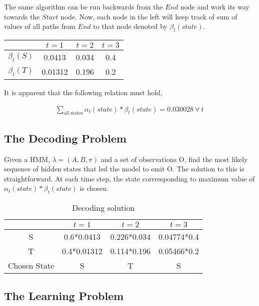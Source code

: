 \documentclass[11pt, a4paper]{article}
\begin{document}
The same algorithm can be run backwards from the $End$ node and work its way towards the $Start$ node. Now, each node in the left will keep track of sum of values of all paths from $End$ to that node denoted by $\beta_t(state)$.

\begin{table}[h!]
	\centering
	\begin{tabular}{c|c|c|c}
		\toprule
		             & $t=1$   & $t=2$ & $t=3$ \\
		\midrule
		$\beta_t(S)$ & 0.0413  & 0.034 & 0.4   \\
		$\beta_t(T)$ & 0.01312 & 0.196 & 0.2   \\
		\bottomrule
	\end{tabular}
\end{table}

It is apparent that the following relation must hold,

\begin{align*}
	\sum_{\text{all states}} \alpha_t(state)*\beta_t(state) = 0.030028\  \forall\ t 
\end{align*}
 
\subsection{The Decoding Problem}

Given a HMM, $\lambda = (A, B, \pi)$ and a set of observations O, find the most likely sequence of hidden states that led the model to emit O. The solution to this is straightforward. At each time step, the state corrresponding to maximum value of $\alpha_t(state)*\beta_t(state)$ is chosen.

\begin{table}[h!]
	\centering
	\caption{Decoding solution}
	\label{tab:table2}
	\begin{tabular}{c|c|c|c}
		\toprule
		             & $t=1$       & $t=2$       & $t=3$       \\
		\midrule
		S            & 0.6*0.0413  & 0.226*0.034 & 0.04774*0.4 \\
		T            & 0.4*0.01312 & 0.114*0.196 & 0.05466*0.2 \\
		\midrule
		Chosen State & S           & T           & S           \\
		\bottomrule
	\end{tabular}
\end{table}

\subsection{The Learning Problem}
\end{document}
